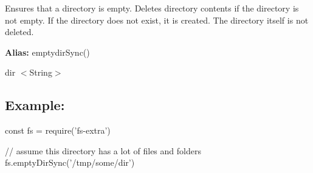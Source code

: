 Ensures that a directory is empty. Deletes directory contents if the directory is not empty. If the directory does not exist, it is created. The directory itself is not deleted.

{\bfseries Alias\+:} {\ttfamily emptydir\+Sync()}


\begin{DoxyItemize}
\item {\ttfamily dir} {\ttfamily $<$String$>$}
\end{DoxyItemize}

\subsection*{Example\+:}


\begin{DoxyCode}
const fs = require('fs-extra')

// assume this directory has a lot of files and folders
fs.emptyDirSync('/tmp/some/dir')
\end{DoxyCode}
 